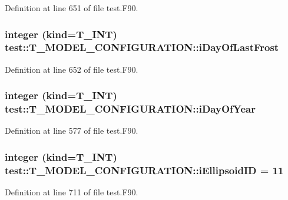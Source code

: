 Definition at line 651 of file test.F90.

\hypertarget{typetest_1_1_t___m_o_d_e_l___c_o_n_f_i_g_u_r_a_t_i_o_n_acf4059294d64a5e1d14d9c270e60fe10}{
\subsubsection[{iDayOfLastFrost}]{\setlength{\rightskip}{0pt plus 5cm}integer (kind={\bf T\_\-INT}) {\bf test::T\_\-MODEL\_\-CONFIGURATION::iDayOfLastFrost}}}
\label{typetest_1_1_t___m_o_d_e_l___c_o_n_f_i_g_u_r_a_t_i_o_n_acf4059294d64a5e1d14d9c270e60fe10}


Definition at line 652 of file test.F90.

\hypertarget{typetest_1_1_t___m_o_d_e_l___c_o_n_f_i_g_u_r_a_t_i_o_n_a4b04b0f7e7a10db7c8d28cea2b6e9848}{
\subsubsection[{iDayOfYear}]{\setlength{\rightskip}{0pt plus 5cm}integer (kind={\bf T\_\-INT}) {\bf test::T\_\-MODEL\_\-CONFIGURATION::iDayOfYear}}}
\label{typetest_1_1_t___m_o_d_e_l___c_o_n_f_i_g_u_r_a_t_i_o_n_a4b04b0f7e7a10db7c8d28cea2b6e9848}


Definition at line 577 of file test.F90.

\hypertarget{typetest_1_1_t___m_o_d_e_l___c_o_n_f_i_g_u_r_a_t_i_o_n_a15427610c01a4eb5b44b03c128c05751}{
\subsubsection[{iEllipsoidID}]{\setlength{\rightskip}{0pt plus 5cm}integer (kind={\bf T\_\-INT}) {\bf test::T\_\-MODEL\_\-CONFIGURATION::iEllipsoidID} = 11}}
\label{typetest_1_1_t___m_o_d_e_l___c_o_n_f_i_g_u_r_a_t_i_o_n_a15427610c01a4eb5b44b03c128c05751}


Definition at line 711 of file test.F90.


